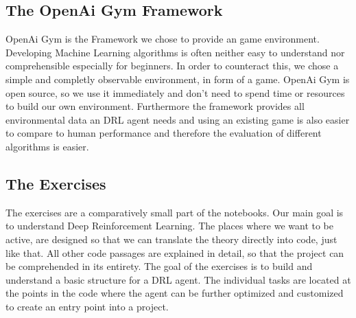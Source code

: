 \subsection{The OpenAi Gym Framework}
	OpenAi Gym is the Framework we chose to provide an game environment. Developing Machine Learning algorithms is often neither easy to understand nor comprehensible especially for beginners. In order to counteract this, we chose a simple and completly observable environment, in form of a game. OpenAi Gym is open source, so we use it immediately and don't need to spend time or resources to build our own environment. Furthermore the framework provides all environmental data an DRL agent needs and using an existing game is also easier to compare to human performance and therefore the evaluation of different algorithms is easier. 

\subsection{The Exercises}
	The exercises are a comparatively small part of the notebooks. Our main goal is to understand Deep Reinforcement Learning. The places where we want to be active, are designed so that we can translate the theory directly into code, just like that. All other code passages are explained in detail, so that the project can be comprehended in its entirety. The goal of the exercises is to build and understand a basic structure for a DRL agent. The individual tasks are located at the points in the code where the agent can be further optimized and customized to create an entry point into a project.
	   
	
